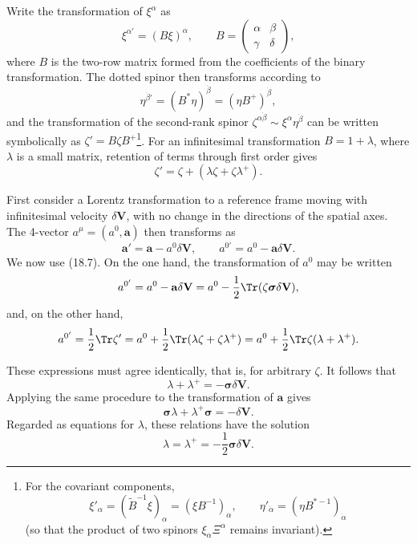 Write the transformation of $\xi^\alpha$ as
\begin{equation}
\xi^{\alpha'}=(B\xi)^\alpha,
\qquad
B=\begin{pmatrix}\alpha&\beta\\\gamma&\delta\end{pmatrix},
\tag{18.8}
\end{equation}
where $B$ is the two-row matrix formed from the coefficients of the binary transformation. The dotted spinor then transforms according to
\begin{equation}
\eta^{\dot\beta'}=(B^*\eta)^{\dot\beta}=(\eta B^+)^{\dot\beta},
\tag{18.9}
\end{equation}
and the transformation of the second-rank spinor $\zeta^{\alpha\dot\beta}\sim\xi^\alpha\eta^{\dot\beta}$ can be written symbolically as $\zeta'=B\zeta B^+$\footnote{For the covariant components,
\begin{equation}
\xi'_\alpha=(\widetilde B^{-1}\xi)_\alpha=(\xi B^{-1})_\alpha,
\qquad
\eta'_{\dot\alpha}=(\eta B^{*-1})_{\dot\alpha}
\tag{18.8a}
\end{equation}
(so that the product of two spinors $\xi_\alpha\Xi^\alpha$ remains invariant).}. For an infinitesimal transformation $B=1+\lambda$, where $\lambda$ is a small matrix, retention of terms through first order gives
\begin{equation}
\zeta'=\zeta+(\lambda\zeta+\zeta\lambda^+).
\tag{18.10}
\end{equation}

First consider a Lorentz transformation to a reference frame moving with infinitesimal velocity $\delta\mathbf V$, with no change in the directions of the spatial axes. The 4-vector $a^\mu=(a^0,\mathbf a)$ then transforms as
\begin{equation}
\mathbf a'=\mathbf a-a^0\delta\mathbf V,
\qquad
a^{0'}=a^0-\mathbf a\delta\mathbf V.
\tag{18.11}
\end{equation}
We now use (18.7). On the one hand, the transformation of $a^0$ may be written
\[
a^{0'}=a^0-\mathbf a\delta\mathbf V
=a^0-\frac12\Tr(\zeta\boldsymbol\sigma\delta\mathbf V),
\]
and, on the other hand,
\[
a^{0'}=\frac12\Tr\zeta'
=a^0+\frac12\Tr(\lambda\zeta+\zeta\lambda^+)
=a^0+\frac12\Tr\zeta(\lambda+\lambda^+).
\]

These expressions must agree identically, that is, for arbitrary $\zeta$. It follows that
\[
\lambda+\lambda^+=-\boldsymbol\sigma\delta\mathbf V.
\]
Applying the same procedure to the transformation of $\mathbf a$ gives
\[
\boldsymbol\sigma\lambda+\lambda^+\boldsymbol\sigma=-\delta\mathbf V.
\]
Regarded as equations for $\lambda$, these relations have the solution
\[
\lambda=\lambda^+=-\frac12\boldsymbol\sigma\delta\mathbf V.
\]

